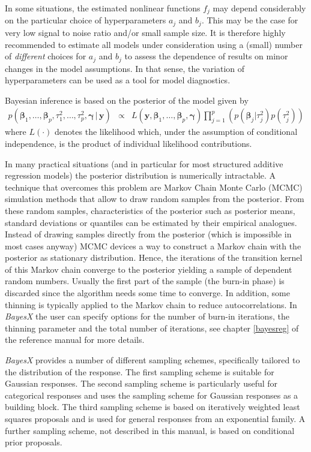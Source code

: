 \documentclass[11pt,a4paper,twoside]{bayesxarticle}
\def \betavec {\boldsymbol{\beta}}
\def \gammavec {\boldsymbol{\gamma}}
\def \yvec {\mathbf{y}}
\begin{document}
In some situations, the estimated nonlinear functions $f_j$ may
depend considerably on the particular choice of hyperparameters
$a_j$ and $b_j$. This may be the case for very low signal to noise
ratio and/or small sample size. It is therefore highly recommended
to estimate all models under consideration using a (small) number of
{\em different} choices for $a_j$ and $b_j$ to assess the dependence
of results on minor changes in the model assumptions. In that sense,
the variation of hyperparameters can be used as a tool for model
diagnostics.

Bayesian inference is based on the posterior of the model given by
\begin{equation}
\label{posterior}
\begin{array}{lll}
 p(\betavec_1,\dots,\betavec_p,\tau^2_1,\dots,\tau^2_p,\gammavec \, | \, \yvec) & \propto & L(\yvec,\betavec_1,\dots,\betavec_p, \gammavec )
\displaystyle \prod_{j=1}^p \left( p(\betavec_j|\tau_j^2) p(\tau^2_j)
\right)
 \end{array}
\end{equation}
where  $L(\cdot)$ denotes the likelihood which, under the assumption
of conditional independence, is the product of individual likelihood
contributions.

In many practical situations (and in particular for most structured
additive regression models) the posterior distribution is
numerically intractable. A technique that overcomes this problem are
Markov Chain Monte Carlo (MCMC) simulation methods that allow to
draw random samples from the posterior. From these random samples,
characteristics of the posterior such as posterior means, standard
deviations or quantiles can be estimated by their empirical
analogues. Instead of drawing samples directly from the posterior
(which is impossible in most cases anyway) MCMC devices a way to
construct a Markov chain with the posterior as stationary
distribution. Hence, the iterations of the transition kernel of this
Markov chain converge to the posterior yielding a sample of
dependent random numbers. Usually the first part of the sample (the
burn-in phase) is discarded since the algorithm needs some time to
converge. In addition, some thinning is typically applied to the
Markov chain to reduce autocorrelations. In {\em BayesX} the user
can specify options for the number of burn-in iterations, the
thinning parameter and the total number of iterations, see chapter
\ref*{bayesreg} of the reference manual for more details.

{\em BayesX} provides a number of different sampling schemes,
specifically tailored to the distribution of the response. The first
sampling scheme is suitable for Gaussian responses. The second
sampling scheme is particularly useful for categorical responses and
uses the sampling scheme for Gaussian responses as a building block.
The third sampling scheme is based on iteratively weighted least
squares proposals and is used for general responses from an
exponential family. A further sampling scheme, not described in this
manual, is based on conditional prior proposals.
\end{document}
